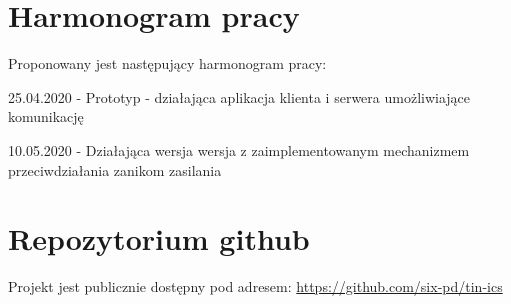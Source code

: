 \documentclass{article}
\begin{document}
\section{Harmonogram pracy\label{harm}}

Proponowany jest następujący harmonogram pracy:


25.04.2020  - Prototyp - działająca aplikacja klienta i serwera umożliwiające komunikację


10.05.2020  - Działająca wersja wersja z zaimplementowanym mechanizmem przeciwdziałania zanikom zasilania

\section{Repozytorium github\label{git}}

Projekt jest publicznie dostępny pod adresem: \url{https://github.com/six-pd/tin-ics}
\end{document}
